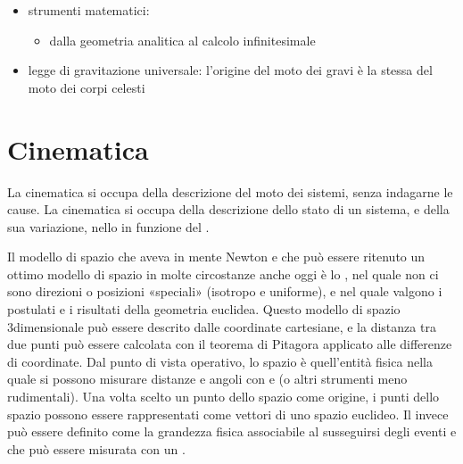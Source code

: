 \documentclass[letterpaper,10pt,italian]{jupyterBook}
\begin{document}
\begin{itemize}
\begin{itemize}
\end{itemize}

\item {} 
\sphinxAtStartPar
strumenti matematici:
\begin{itemize}
\item {} 
\sphinxAtStartPar
dalla geometria analitica al calcolo infinitesimale

\end{itemize}

\item {} 
\sphinxAtStartPar
legge di gravitazione universale: l’origine del moto dei gravi è la stessa del moto dei corpi celesti

\end{itemize}

\sphinxstepscope




\chapter{Cinematica}
\label{\detokenize{ch/mechanics/kinematics:cinematica}}\label{\detokenize{ch/mechanics/kinematics:physics-hs-mechanics-kinematics}}\label{\detokenize{ch/mechanics/kinematics::doc}}
\sphinxAtStartPar
La cinematica si occupa della descrizione del moto dei sistemi, senza indagarne le cause. La cinematica si occupa della descrizione dello stato di un sistema, e della sua variazione, nello  in funzione del .

\sphinxAtStartPar
{} Il modello di spazio che aveva in mente Newton \sphinxhyphen{} e che può essere ritenuto un ottimo modello di spazio in molte circostanze anche oggi \sphinxhyphen{} è lo , nel quale non ci sono direzioni o posizioni «speciali» (isotropo e uniforme), e nel quale valgono i postulati e i risultati della geometria euclidea. Questo modello di spazio 3\sphinxhyphen{}dimensionale può essere descrito dalle coordinate cartesiane, e la distanza tra due punti può essere calcolata con il teorema di Pitagora applicato alle differenze di coordinate. Dal punto di vista operativo, lo spazio è quell’entità fisica nella quale si possono misurare distanze e angoli con  e  (o altri strumenti meno rudimentali). Una volta scelto un punto dello spazio come origine, i punti dello spazio possono essere rappresentati come vettori di uno spazio euclideo.
Il  invece può essere definito come la grandezza fisica associabile al susseguirsi degli eventi e che può essere misurata con un .
\end{document}
